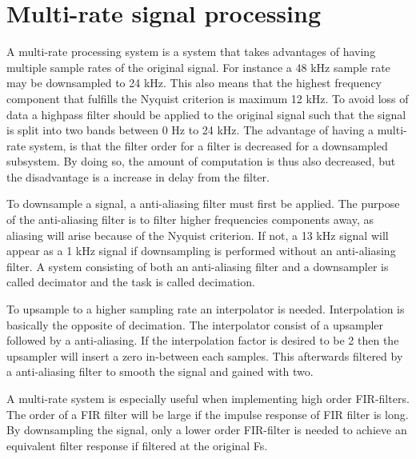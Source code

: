 \section{Multi-rate signal processing}

A multi-rate processing system is a system that takes advantages of having multiple sample rates of the original signal. For instance a 48 kHz sample rate may be downsampled to 24 kHz. This also means that the highest frequency component that fulfills the Nyquist criterion is maximum 12 kHz. To avoid loss of data a highpass filter should be applied to the original signal such that the signal is split into two bands between 0 Hz to 24 kHz. The advantage of having a multi-rate system, is that the filter order for a filter is decreased for a downsampled subsystem. By doing so, the amount of computation is thus also decreased, but the disadvantage is a increase in delay from the filter. 

To downsample a signal, a anti-aliasing filter must first be applied. The purpose of the anti-aliasing filter is to filter higher frequencies components away, as aliasing will arise because of the Nyquist criterion. If not, a 13 kHz signal will appear as a 1 kHz signal if downsampling is performed without an anti-aliasing filter. A system consisting of both an anti-aliasing filter and a downsampler is called decimator and the task is called decimation.

To upsample to a higher sampling rate an interpolator is needed. Interpolation is basically the opposite of decimation. The interpolator consist of a upsampler followed by a anti-aliasing. If the interpolation factor is desired to be 2 then the upsampler will insert a zero in-between each samples. This afterwards filtered by a anti-aliasing filter to smooth the signal and gained with two.  

A multi-rate system is especially useful when implementing high order FIR-filters. The order of a FIR filter will be large if the impulse response of FIR filter is long. By downsampling the signal, only a lower order FIR-filter is needed to achieve an equivalent filter response if filtered at the original Fs.



